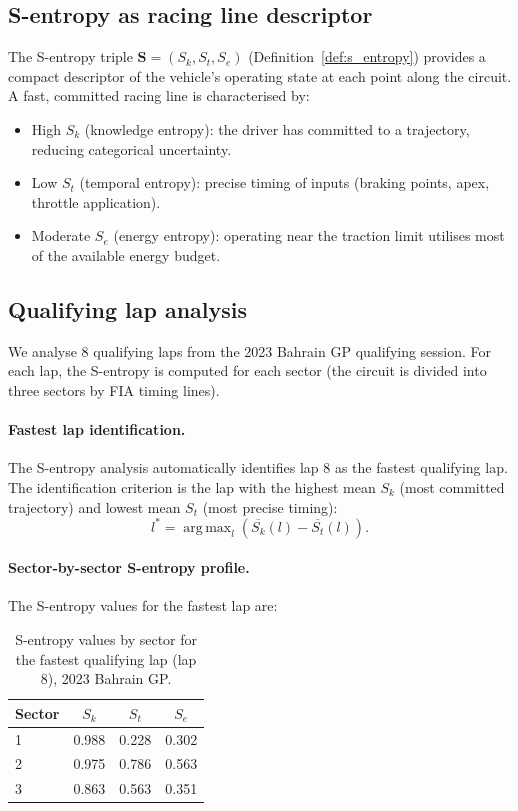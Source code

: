 \documentclass[twocolumn,10pt,a4paper]{article}
\theoremstyle{definition}
\theoremstyle{remark}
\newcommand{\Sent}{\mathbf{S}}
\DeclareMathOperator*{\argmax}{arg\,max}
\begin{document}
\subsection{S-entropy as racing line descriptor}

The S-entropy triple $\Sent = (S_k, S_t, S_e)$ (Definition~\ref{def:s_entropy}) provides a compact descriptor of the vehicle's operating state at each point along the circuit. A fast, committed racing line is characterised by:
\begin{itemize}
    \item High $S_k$ (knowledge entropy): the driver has committed to a trajectory, reducing categorical uncertainty.
    \item Low $S_t$ (temporal entropy): precise timing of inputs (braking points, apex, throttle application).
    \item Moderate $S_e$ (energy entropy): operating near the traction limit utilises most of the available energy budget.
\end{itemize}

\subsection{Qualifying lap analysis}

We analyse 8 qualifying laps from the 2023 Bahrain GP qualifying session. For each lap, the S-entropy is computed for each sector (the circuit is divided into three sectors by FIA timing lines).



\paragraph{Fastest lap identification.}
The S-entropy analysis automatically identifies lap 8 as the fastest qualifying lap. The identification criterion is the lap with the highest mean $S_k$ (most committed trajectory) and lowest mean $S_t$ (most precise timing):
\begin{equation}\label{eq:fastest_criterion}
    l^* = \argmax_l \left( \overline{S_k}(l) - \overline{S_t}(l) \right).
\end{equation}

\paragraph{Sector-by-sector S-entropy profile.}
The S-entropy values for the fastest lap are:

\begin{table}[!htbp]
\centering
\caption{S-entropy values by sector for the fastest qualifying lap (lap 8), 2023 Bahrain GP.}
\label{tab:s_entropy}
\begin{tabular}{@{}lccc@{}}
\toprule
Sector & $S_k$ & $S_t$ & $S_e$ \\
\midrule
1 & 0.988 & 0.228 & 0.302 \\
2 & 0.975 & 0.786 & 0.563 \\
3 & 0.863 & 0.563 & 0.351 \\
\bottomrule
\end{tabular}
\end{table}
\end{document}
